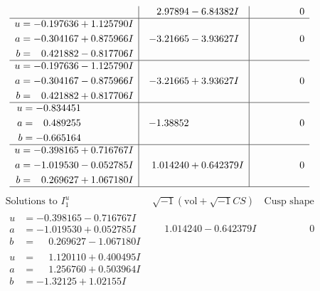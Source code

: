 \documentclass[1p]{elsarticle_modified}
\theoremstyle{definition}
\newcommand{\I}{\sqrt{-1}}
\begin{document}
$$\begin{array}{c|c|c}
 & \phantom{-}2.97894 - 6.84382 I & \phantom{-0.000000 } 0 \\ \hline\begin{aligned}
u &= -0.197636 + 1.125790 I \\
a &= -0.304167 + 0.875966 I \\
b &= \phantom{-}0.421882 - 0.817706 I\end{aligned}
 & -3.21665 - 3.93627 I & \phantom{-0.000000 } 0 \\ \hline\begin{aligned}
u &= -0.197636 - 1.125790 I \\
a &= -0.304167 - 0.875966 I \\
b &= \phantom{-}0.421882 + 0.817706 I\end{aligned}
 & -3.21665 + 3.93627 I & \phantom{-0.000000 } 0 \\ \hline\begin{aligned}
u &= -0.834451\phantom{ +0.000000I} \\
a &= \phantom{-}0.489255\phantom{ +0.000000I} \\
b &= -0.665164\phantom{ +0.000000I}\end{aligned}
 & -1.38852\phantom{ +0.000000I} & \phantom{-0.000000 } 0 \\ \hline\begin{aligned}
u &= -0.398165 + 0.716767 I \\
a &= -1.019530 - 0.052785 I \\
b &= \phantom{-}0.269627 + 1.067180 I\end{aligned}
 & \phantom{-}1.014240 + 0.642379 I & \phantom{-0.000000 } 0\\
 \hline 
 \end{array}$$\newpage$$\begin{array}{c|c|c}  
\text{Solutions to }I^u_{1}& \I (\text{vol} + \sqrt{-1}CS) & \text{Cusp shape}\\
 \hline 
\begin{aligned}
u &= -0.398165 - 0.716767 I \\
a &= -1.019530 + 0.052785 I \\
b &= \phantom{-}0.269627 - 1.067180 I\end{aligned}
 & \phantom{-}1.014240 - 0.642379 I & \phantom{-0.000000 } 0 \\ \hline\begin{aligned}
u &= \phantom{-}1.120110 + 0.400495 I \\
a &= \phantom{-}1.256760 + 0.503964 I \\
b &= -1.32125 + 1.02155 I\end{aligned}

\end{array}$$
\end{document}
